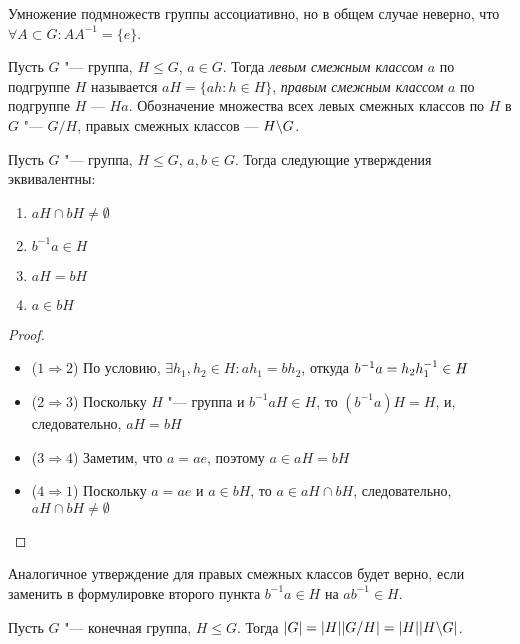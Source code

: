 \begin{note}
	Умножение подмножеств группы ассоциативно, но в общем случае неверно, что $\forall A \subset G: AA^{-1} = \{e\}$.
\end{note}

\begin{definition}
	Пусть $G$ "--- группа, $H \le G$, $a \in G$. Тогда \textit{левым смежным классом} $a$ по подгруппе $H$ называется $aH = \{ah: h \in H\}$, \textit{правым смежным классом} $a$ по подгруппе $H$ --- $Ha$. Обозначение множества всех левых смежных классов по $H$ в $G$ "--- $G/H$, правых смежных классов --- $H\backslash G$.
\end{definition}

\begin{proposition}
	Пусть $G$ "--- группа, $H \le G$, $a, b \in G$. Тогда следующие утверждения эквивалентны:
	\begin{enumerate}
		\item $aH \cap bH \ne \emptyset$
		\item $b^{-1}a \in H$
		\item $aH = bH$
		\item $a \in bH$
	\end{enumerate}
\end{proposition}

\begin{proof}~
	\begin{itemize}
		\item ($1 \Rightarrow 2$) По условию, $\exists h_1, h_2 \in H: ah_1 = bh_2$, откуда $b^{-1}a \hm= h_2h_1^{-1} \in H$
		\item ($2 \Rightarrow 3$) Поскольку $H$ "--- группа и $b^{-1}aH \in H$, то $(b^{-1}a)H = H$, и, следовательно, $aH = bH$
		\item ($3 \Rightarrow 4$) Заметим, что $a = ae$, поэтому $a \in aH = bH$
		\item ($4 \Rightarrow 1$) Поскольку $a = ae$ и $a \in bH$, то $a \in aH \cap bH$, следовательно, $aH \cap bH \ne \emptyset$
	\end{itemize}
\end{proof}

\begin{note}
	Аналогичное утверждение для правых смежных классов будет верно, если заменить в формулировке второго пункта $b^{-1}a \in H$ на $ab^{-1} \in H$.
\end{note}

\begin{theorem}[Лагранжа]
	Пусть $G$ "--- конечная группа, $H \le G$. Тогда $|G| = |H||G / H| \hm= |H||H \bs G|$.
\end{theorem}

